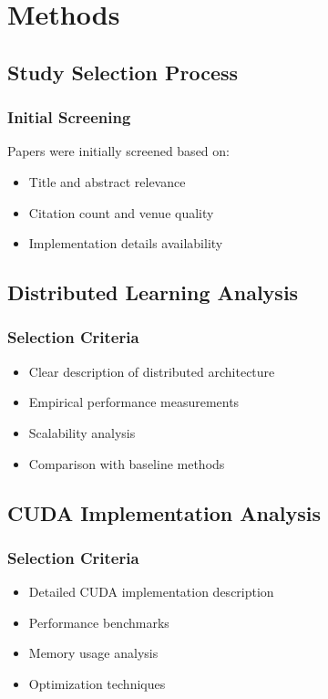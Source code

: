 \section{Methods}
\label{sec:methods}

\subsection{Study Selection Process}
\subsubsection{Initial Screening}
Papers were initially screened based on:
\begin{itemize}
    \item Title and abstract relevance
    \item Citation count and venue quality
    \item Implementation details availability
\end{itemize}

\subsection{Distributed Learning Analysis}
\subsubsection{Selection Criteria}
\begin{itemize}
    \item Clear description of distributed architecture
    \item Empirical performance measurements
    \item Scalability analysis
    \item Comparison with baseline methods
\end{itemize}

\subsection{CUDA Implementation Analysis}
\subsubsection{Selection Criteria}
\begin{itemize}
    \item Detailed CUDA implementation description
    \item Performance benchmarks
    \item Memory usage analysis
    \item Optimization techniques
\end{itemize}

